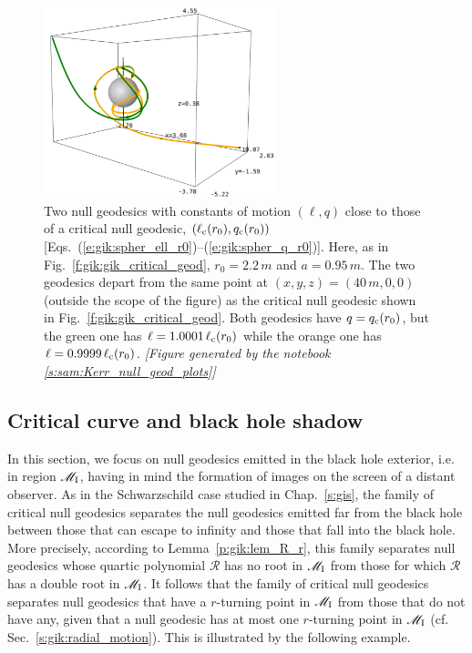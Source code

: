 \begin{figure}
\centerline{\includegraphics[width=0.6\textwidth]{gik_close_critical.png}}
\caption[]{\label{f:gik:close_critical} \footnotesize
Two null geodesics with constants of motion $(\ell,q)$ close
to those of a critical null
geodesic, $(\ell_{\rm c}(r_0),q_{\rm c}(r_0))$
[Eqs.~(\ref{e:gik:spher_ell_r0})--(\ref{e:gik:spher_q_r0})]. Here,
as in Fig.~\ref{f:gik:gik_critical_geod}, $r_0=2.2\, m$ and $a=0.95\, m$.
The two geodesics depart from the
same point at $(x,y,z)=(40\, m, 0, 0)$ (outside the scope of the figure)
as the critical null geodesic shown in Fig.~\ref{f:gik:gik_critical_geod}.
Both geodesics have $q = q_{\rm c}(r_0)$, but the green one
has $\ell = 1.0001\,\ell_{\rm c}(r_0)$
while the orange one has $\ell = 0.9999\,\ell_{\rm c}(r_0)$.
\textsl{[Figure generated by the notebook \ref{s:sam:Kerr_null_geod_plots}]}
}
\end{figure}



\subsection{Critical curve and black hole shadow} \label{s:gik:shadow_generic}

In this section, we focus on null geodesics emitted in the black hole
exterior, i.e. in region $\mathscr{M}_{\rm I}$, having in mind the formation
of images on the screen of a distant observer.
As in the Schwarzschild case studied in Chap.~\ref{s:gis}, the family
of critical null geodesics separates the null geodesics emitted far from the
black hole between those
that can escape to infinity and those that fall into the black hole.
More precisely, according to Lemma~\ref{p:gik:lem_R_r},
this family separates null geodesics whose quartic polynomial $\mathscr{R}$
has no root in $\mathscr{M}_{\rm I}$ from those for which $\mathscr{R}$ has a double
root in $\mathscr{M}_{\rm I}$. It follows that the family of critical null
geodesics separates null geodesics that have a $r$-turning
point in $\mathscr{M}_{\rm I}$ from those that do not have any, given that a null geodesic has at most
one $r$-turning point in $\mathscr{M}_{\rm I}$ (cf. Sec.~\ref{s:gik:radial_motion}).
This is illustrated by the following example.

